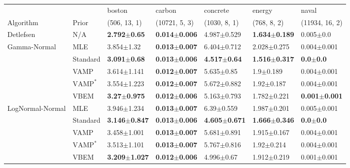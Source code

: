 \begin{tabular}{lllllll}
\toprule
                 &      &                    boston &                    carbon &                  concrete &                    energy &                     naval \\
Algorithm & Prior& (506, 13, 1)& (10721, 5, 3)& (1030, 8, 1)& (768, 8, 2)& (11934, 16, 2)\\
\midrule
Detlefsen & N/A &   \textbf{2.792$\pm$0.65} &  \textbf{0.014$\pm$0.006} &           4.987$\pm$0.529 &  \textbf{1.634$\pm$0.189} &             0.005$\pm$0.0 \\
Gamma-Normal & MLE &            3.854$\pm$1.32 &  \textbf{0.013$\pm$0.007} &           6.404$\pm$0.712 &           2.028$\pm$0.275 &           0.004$\pm$0.001 \\
                 & Standard &   \textbf{3.091$\pm$0.68} &  \textbf{0.013$\pm$0.006} &   \textbf{4.517$\pm$0.64} &  \textbf{1.516$\pm$0.317} &      \textbf{0.0$\pm$0.0} \\
                 & VAMP &           3.614$\pm$1.141 &  \textbf{0.012$\pm$0.007} &            5.635$\pm$0.85 &             1.9$\pm$0.189 &           0.004$\pm$0.001 \\
                 & $\text{VAMP}^*$ &           3.554$\pm$1.223 &  \textbf{0.012$\pm$0.007} &           5.672$\pm$0.882 &            1.92$\pm$0.187 &           0.004$\pm$0.001 \\
                 & VBEM &   \textbf{3.27$\pm$0.975} &  \textbf{0.012$\pm$0.006} &           5.163$\pm$0.793 &           1.782$\pm$0.221 &  \textbf{0.001$\pm$0.001} \\
LogNormal-Normal & MLE &           3.946$\pm$1.234 &  \textbf{0.013$\pm$0.007} &            6.39$\pm$0.559 &           1.987$\pm$0.201 &           0.005$\pm$0.001 \\
                 & Standard &  \textbf{3.146$\pm$0.847} &  \textbf{0.013$\pm$0.006} &  \textbf{4.605$\pm$0.671} &  \textbf{1.666$\pm$0.346} &      \textbf{0.0$\pm$0.0} \\
                 & VAMP &           3.458$\pm$1.001 &  \textbf{0.013$\pm$0.007} &           5.681$\pm$0.891 &           1.915$\pm$0.167 &           0.004$\pm$0.001 \\
                 & $\text{VAMP}^*$ &           3.513$\pm$1.101 &  \textbf{0.013$\pm$0.007} &           5.767$\pm$0.816 &            1.92$\pm$0.214 &           0.004$\pm$0.001 \\
                 & VBEM &  \textbf{3.209$\pm$1.027} &  \textbf{0.012$\pm$0.006} &            4.996$\pm$0.67 &           1.912$\pm$0.219 &           0.001$\pm$0.001 \\

\end{tabular}
